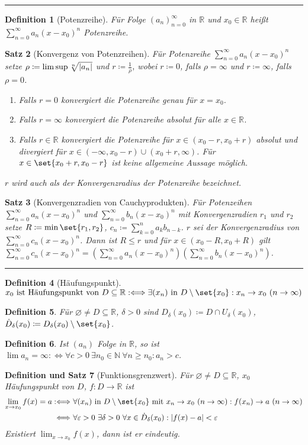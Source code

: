 \documentclass[a4paper]{article}
\newcounter{Sec}
\theoremstyle{marginbreak}
\newtheorem{definition}{Definition}[Sec]
\newtheorem{satz}[definition]{Satz}
\newtheorem{defsatz}[definition]{Definition und Satz}
\newcommand{\sep}{%
	\rule{\textwidth}{0.3pt}%
	\stepcounter{Sec}%
	}
\newcommand{\defiff}{:\Longleftrightarrow}
\newcommand{\en}{~(n\to\infty)}
\newcommand{\series}[1][1]{\sum_{n=#1}^\infty}
\newcommand{\ps}[1][a]{\series[0]#1_n(x-x_0)^n}
\begin{document}
	\sep
	\begin{definition}[Potenzreihe]
		Für Folge $(a_n)_{n=0}^\infty$ in $\mathbb{R}$ und $x_0\in\mathbb{R}$
		heißt $\ps$ Potenzreihe.
	\end{definition}
	\begin{satz}[Konvergenz von Potenzreihen]
		Für Potenzreihe $\ps$ setze
		$\rho\coloneqq\lim\sup\sqrt[n]{\abs{a_n}}$ und $r\coloneqq\frac{1}{\rho}$,
		wobei $r\coloneqq0$, falls $\rho=\infty$ und $r\coloneqq\infty$, falls
		$\rho=0$.
		\begin{enumerate}[label=(\alph*)]
			\item Falls $r=0$ konvergiert die Potenzreihe genau für $x=x_0$.
			\item Falls $r=\infty$ konvergiert die Potenzreihe absolut für alle $x\in\mathbb{R}$.
			\item Falls $r\in\mathbb{R}$ konvergiert die Potenzreihe für $x \in (x_0 - r, x_0 + r)$
				absolut und divergiert für $x \in (-\infty, x_0-r) \cup (x_0+r, \infty)$. Für
				$x\in\set{x_0+r,x_0-r}$ ist keine allgemeine Aussage möglich.
		\end{enumerate}
		$r$ wird auch als der Konvergenzradius der Potenzreihe bezeichnet.
	\end{satz}
	\begin{satz}[Konvergenzradien von Cauchyprodukten]
		Für Potenzeihen $\ps$ und $\ps[b]$ mit Konvergenzradien $r_1$ und $r_2$
		setze $R\coloneqq\min\set{r_1,r_2}$, $c_n\coloneqq\sum_{k=0}^na_kb_{n-k}$.
		$r$ sei der Konvergenzradius von $\ps[c]$. Dann ist $R\leq r$ und für
		$x\in(x_0-R,x_0+R)$ gilt $\ps[c]=(\ps)(\ps[b])$.
	\end{satz}
	\sep
	\begin{definition}[Häufungspunkt]
		$x_0~\text{ist Häufungspunkt von}~D\subseteq\mathbb{R}
		\defiff\exists(x_n)~\text{in $D\setminus\set{x_0}$}:x_n\to x_0\en$
	\end{definition}
	\begin{definition}
		Für $\varnothing\neq D\subseteq\mathbb{R}$, $\delta>0$ sind
		$D_\delta(x_0)\coloneqq D\cap U_\delta(x_0)$, $\dot{D}_\delta(x_0)\coloneqq
		D_\delta(x_0)\setminus\set{x_0}$.
	\end{definition}
	\begin{definition}
		Ist $(a_n)$ Folge in $\mathbb{R}$, so ist
		$\lim a_n = \infty\defiff \forall c>0~\exists n_0\in\mathbb{N}~\forall n\geq n_0:a_n>c$.
	\end{definition}
	\begin{defsatz}[Funktionsgrenzwert]
		Für $\varnothing\neq D\subseteq\mathbb{R}$, $x_0$ Häufungspunkt von $D$,
		$f\colon D\to\mathbb{R}$ ist
		\begin{align*}
			\lim_{x\to x_0}f(x) = a
			\defiff&~\forall(x_n)~\text{in}~D\setminus\set{x_0}~\text{mit}~x_n\to x_0\en:f(x_n)\to a\en\\
			\Longleftrightarrow&~\forall\varepsilon>0~\exists\delta>0~\forall x\in\dot{D}_\delta(x_0):\abs{f(x)-a}<\varepsilon
		\end{align*}
		Existiert $\lim_{x\to x_0}f(x)$, dann ist er eindeutig.
	\end{defsatz}
\end{document}
